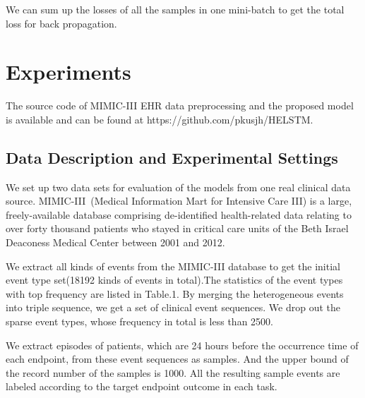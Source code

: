 \documentclass[letterpaper]{article} %
\begin{document}
We can sum up the losses of all the samples in one mini-batch to get the total loss for back propagation.


\section{Experiments}
The source code of MIMIC-III EHR data preprocessing and the proposed model is available and can be found at https://github.com/pkusjh/HELSTM.

\subsection{Data Description and Experimental Settings}
We set up two data sets for evaluation of the models from one real clinical data source. MIMIC-III~\cite{johnson2016mimic}(Medical Information Mart for Intensive Care III) is a large, freely-available database comprising de-identified health-related data relating to over forty thousand patients who stayed in critical care units of the Beth Israel Deaconess Medical Center between 2001 and 2012.

We extract all kinds of events from the MIMIC-III database to get the initial event type  set(18192 kinds of events in total).The statistics of the event types with top frequency are listed in Table.1. By merging the heterogeneous events into triple sequence, we get a set of clinical event sequences. We drop out the sparse event types, whose frequency in total is less than 2500. 

 We extract episodes of patients, which are 24 hours before the occurrence time of each endpoint, from these event sequences as samples. And the upper bound of the record number of the samples is 1000. All the resulting sample events are labeled according to the target endpoint outcome in each task. 
\end{document}
